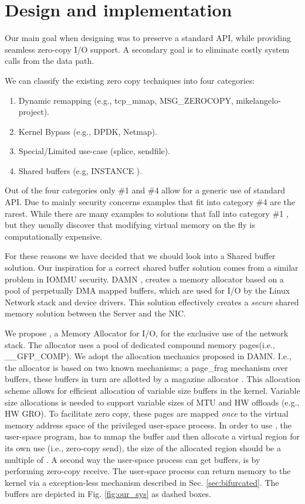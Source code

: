 
\section{Design and implementation}\label{sec:design}
Our main goal when designing \oursys was to preserve a standard \sockets API, while providing seamless zero-copy I/O support. A secondary goal is to eliminate costly system calls from the data path. 

We can classify the existing zero copy techniques into four categories:
\begin{enumerate}
    \item Dynamic remapping (e.g., tcp\_mmap, MSG\_ZEROCOPY\cite{desendmsg}, mikelangelo-project\cite{mikelangelo}).
    \item Kernel Bypass (e.g., DPDK, Netmap\cite{rizzo2012netmap}).
    \item Special/Limited use-case (splice, sendfile).
    \item Shared buffers (e.g, INSTANCE \cite{instance}).
\end{enumerate}
Out of the four categories only \#1 and \#4 allow for a generic use of standard \sockets API. Due to mainly security concerns examples that fit into category \#4 are the rarest.
While there are many examples to solutions that fall into category \#1 \cite{mikelangelo-empty,desendmsg}, but they usually discover that modifying virtual memory on the fly is computationally expensive. 

For these reasons we have decided that we should look into a Shared buffer solution. Our inspiration for a correct shared buffer solution comes from a similar problem in IOMMU security. DAMN \cite{markuze2018damn}, creates a memory allocator based on a pool of perpetually DMA mapped buffers, which are used for I/O by the Linux Network stack and device drivers. This solution effectively creates a \emph{secure} shared memory solution between the Server and the NIC.

We propose \oursys, a Memory Allocator for I/O, for the  exclusive use of the network stack. The \oursys allocator uses a pool of dedicated compound memory pages(i.e., \_\_GFP\_COMP). We adopt the allocation mechanics proposed in DAMN\cite{markuze2018damn}. I.e., the allocator is based on two known mechanisms; a page\_frag mechanism \cite{pagefrag} over \size buffers, these buffers in turn are allotted by a magazine allocator \cite{bonwick2001magazines}. This allocation scheme allows for efficient allocation of variable size buffers in the kernel. Variable size allocations is needed to support variable sizes of MTU and HW offloads (e.g., HW GRO). 
To facilitate zero copy, these pages are mapped \emph{once} to the virtual memory address space of the privileged user-space process. In order to use \oursys, the user-space program, has to mmap the \oursys buffer and then allocate a virtual region for its own use (i.e., zero-copy send), the size of the allocated region should be a multiple of \size. A second way the user-space process can get \oursys buffers, is by performing zero-copy receive. The user-space process can return memory to the kernel via a exception-less mechanism described in Sec. \ref{sec:bifurcated}.
The \oursys buffers are depicted in Fig. \ref{fig:our_sys} as dashed boxes.
